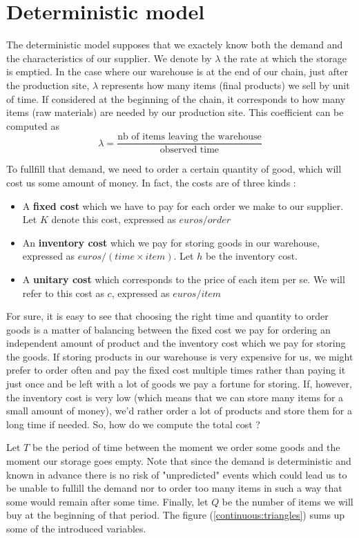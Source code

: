 \section{Deterministic model}

The deterministic model supposes that we exactely know both the demand and the characteristics of our supplier. We denote by $\lambda$ the rate at which the storage is emptied. In the case where our warehouse is at the end of our chain, just after the production site, $\lambda$ represents how many items (final products) we sell by unit of time. If considered at the beginning of the chain, it corresponds to how many items (raw materials) are needed by our production site. This coefficient can be computed as \[ \lambda = \frac{\textrm{nb of items leaving the warehouse}}{\textrm{observed time}} \]

To fullfill that demand, we need to order a certain quantity of good, which will cost us some amount of money. In fact, the costs are of three kinds : 
\begin{itemize}
    \item A \textbf{fixed cost} which we have to pay for each order we make to our supplier. Let $K$ denote this cost, expressed as $euros/order$
    \item An \textbf{inventory cost} which we pay for storing goods in our warehouse, expressed as $euros/(time\times item)$. Let $h$ be the inventory cost.
    \item A \textbf{unitary cost} which corresponds to the price of each item per se. We will refer to this cost as $c$, expressed as $euros/item$
\end{itemize}

For sure, it is easy to see that choosing the right time and quantity to order goods is a matter of balancing between the fixed cost we pay for ordering an independent amount of product and the inventory cost which we pay for storing the goods. If storing products in our warehouse is very expensive for us, we might prefer to order often and pay the fixed cost multiple times rather than paying it just once and be left with a lot of goods we pay a fortune for storing. If, however, the inventory cost is very low (which means that we can store many items for a small amount of money), we'd rather order a lot of products and store them for a long time if needed. So, how do we compute the total cost ? 

Let $T$ be the period of time between the moment we order some goods and the moment our storage goes empty. Note that since the demand is deterministic and known in advance there is no risk of "unpredicted" events which could lead us to be unable to fullill the demand nor to order too many items in such a way that some would remain after some time. Finally, let $Q$ be the number of items we will buy at the beginning of that period. The figure (\ref{continuous:triangles}) sums up some of the introduced variables. 

